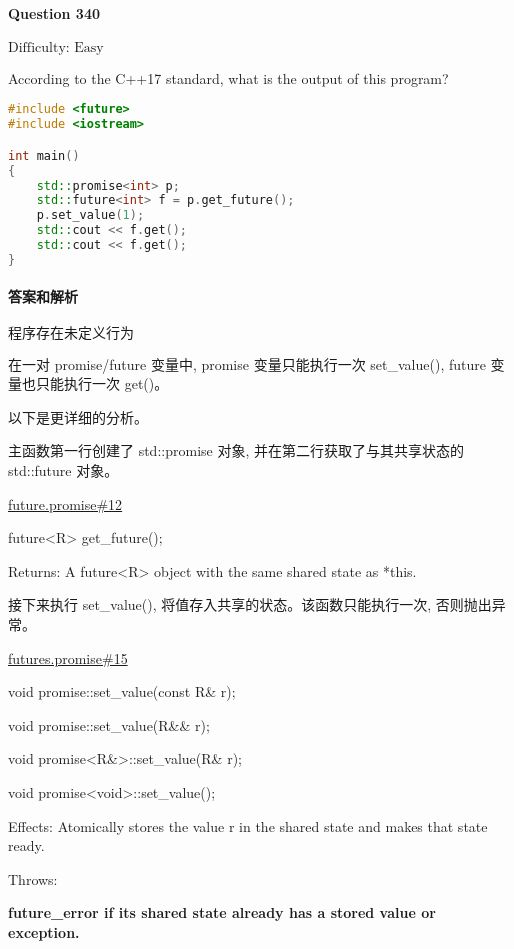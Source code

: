 \documentclass{article}
\begin{document}
	\paragraph*{Question 340} $\boxed{\text{Difficulty: Easy}} $			
	
	According to the C++17 standard, what is the output of this program?
	
	\begin{lstlisting}[language=C++]  		
#include <future>
#include <iostream>

int main()
{
	std::promise<int> p;
	std::future<int> f = p.get_future();
	p.set_value(1);
	std::cout << f.get();
	std::cout << f.get();
}
	\end{lstlisting}
	
	\paragraph*{答案和解析} $\boxed{\text{程序存在未定义行为}} $
	
	在一对 promise/future 变量中, promise 变量只能执行一次 set\_value(), future 变量也只能执行一次 get()。
	
	以下是更详细的分析。
	
	主函数第一行创建了 std::promise 对象, 并在第二行获取了与其共享状态的 std::future 对象。
	
	\href{https://timsong-cpp.github.io/cppwp/n4659/futures.promise#12}{future.promise\#12}
	\begin{lightgrayleftbar}
		future<R> get\_future();
		
		Returns: A future<R> object with the same shared state as *this.
	\end{lightgrayleftbar}
	
	接下来执行 set\_value(), 将值存入共享的状态。该函数只能执行一次, 否则抛出异常。
	
	\href{https://timsong-cpp.github.io/cppwp/n4659/futures.promise#15}{futures.promise\#15}
	
	\begin{lightgrayleftbar}
		void promise::set\_value(const R\& r);
		
		void promise::set\_value(R\&\& r);
		
		void promise<R\&>::set\_value(R\& r);
		
		void promise<void>::set\_value();
		
		Effects: Atomically stores the value r in the shared state and makes that state ready.
		
		Throws:
		
		\textbf{future\_­error if its shared state already has a stored value or exception.}
	\end{lightgrayleftbar}
	
\end{document}
